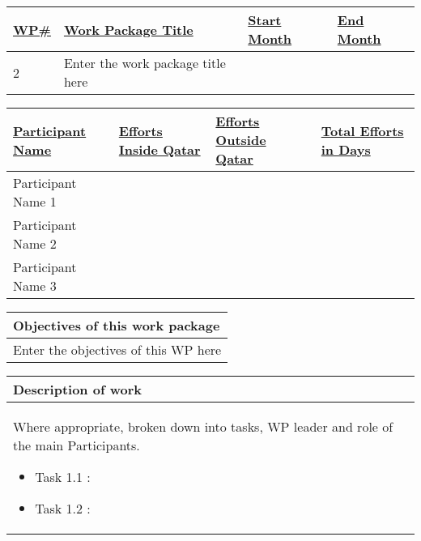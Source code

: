 \documentclass[a4paper,11pt]{nprp}
\begin{document}
\begin{center}

\setlength{\realwidth}{\dimexpr \textwidth - 8\tabcolsep - 5\arrayrulewidth}
\begin{tabular}{|p{0.1\realwidth}|p{0.6\realwidth}|p{0.15\realwidth}|p{0.15\realwidth}|}
\hline
  \textbf{\ul{WP\#}} & 
  \textbf{\ul{Work Package Title}} & 
  \textbf{\ul{Start Month}} &
  \textbf{\ul{End Month}} \\
\hline
2 & Enter the work package title here &  &  \\
\hline
\end{tabular}

\vspace{1em}

\setlength{\realwidth}{\dimexpr \textwidth - 8\tabcolsep - 5\arrayrulewidth}
\begin{tabular}{|p{0.4\realwidth}|p{0.22\realwidth}|p{0.2\realwidth}|C{0.18\realwidth}|}
\hline
  \textbf{\ul{Participant Name}} & 
  \textbf{\ul{Efforts Inside Qatar}} & 
  \textbf{\ul{Efforts Outside Qatar}} &
  \textbf{\ul{Total Efforts in Days}} \\
\hline
Participant Name 1 &  &  &  \\
\hline
Participant Name 2 &  &  &  \\
\hline
Participant Name 3 &  &  &  \\
\hline
\end{tabular}

\vspace{1em}

\setlength{\realwidth}{\dimexpr \textwidth - 2\tabcolsep - 2\arrayrulewidth}
\begin{tabular}{|p{1\realwidth}|}
\hline
\textbf{Objectives of this work package} \\
\hline
Enter the objectives of this WP here \\
\hline
\end{tabular}

\vspace{1em}

\begin{tabular}{|p{1\realwidth}|}
\hline
\textbf{Description of work} \\
\hline
Where appropriate, broken down into tasks, WP leader and role of the main Participants.
\begin{itemize}
  \item Task 1.1 :
  \item Task 1.2 :
\end{itemize}
 \\
\hline
\end{tabular}


\end{center}
\end{document}
